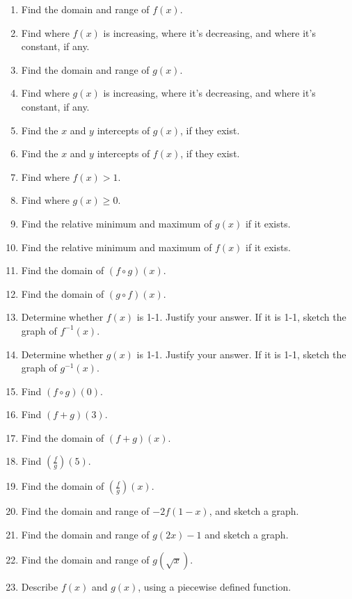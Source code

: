 \documentclass{ximera}
\begin{document}
\begin{exercise}
\begin{enumerate}
\item Find the domain and range of $f(x)$. 
\item Find where $f(x)$ is increasing, where it's decreasing, and where it's constant, if any.
\item Find the domain and range of $g(x)$.
\item Find where $g(x)$ is increasing, where it's decreasing, and where it's constant, if any.
\item Find the $x$ and $y$ intercepts of $g(x)$, if they exist. 
\item Find the $x$ and $y$ intercepts of $f(x)$, if they exist. 
\item Find where $f(x)>1$. 
\item Find where $g(x)\geq 0$. 
\item Find the relative minimum and maximum of $g(x)$ if it exists.
\item Find the relative minimum and maximum of $f(x)$ if it exists.
\item Find the domain of $(f\circ g)(x)$. 
\item Find the domain of $(g\circ f)(x)$. 
\item Determine whether $f(x)$ is 1-1. Justify your answer. If it is 1-1, sketch the graph of $f^{-1}(x)$.
\item Determine whether $g(x)$ is 1-1. Justify your answer. If it is 1-1, sketch the graph of $g^{-1}(x)$. 
\item Find $(f\circ g)(0)$. 
\item Find $(f+g)(3)$.
\item Find the domain of $(f+g)(x)$.
\item Find $\displaystyle \left(\frac{f}{g}\right)(5)$. 
\item Find the domain of $\displaystyle \left(\frac{f}{g}\right)(x)$.
\item Find the domain and range of $-2f(1-x)$, and sketch a graph. 
\item Find the domain and range of $g(2x)-1$ and sketch a graph. 
\item Find the domain and range of $g(\sqrt{x})$.
\item Describe $f(x)$ and $g(x)$, using a piecewise defined function. 
\end{enumerate}

\end{exercise}
\end{document}
